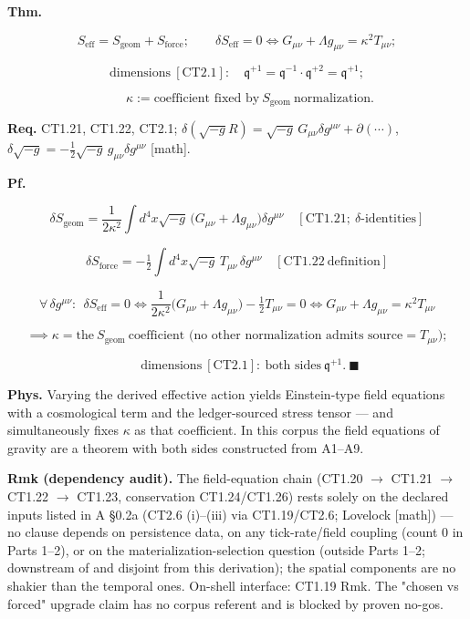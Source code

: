 \begin{theorem}\label{tag:CT1-23}
\textbf{Thm.}

\[
S_{\mathrm{eff}}=S_{\mathrm{geom}}+S_{\mathrm{force}};\qquad
\delta S_{\mathrm{eff}}=0\iff G_{\mu\nu}+\Lambda g_{\mu\nu}=\kappa^2T_{\mu\nu};
\]

\[
\text{dimensions}\ [\mathrm{CT2.1}]:\quad\mathfrak q^{+1}=\mathfrak q^{-1}\cdot\mathfrak q^{+2}=\mathfrak q^{+1};
\]

\[
\qquad \kappa:=\text{coefficient fixed by}\ S_{\mathrm{geom}}\ \text{normalization}.
\]

\textbf{Req.} CT1.21, CT1.22, CT2.1; $\delta(\sqrt{-g}R)=\sqrt{-g}\,G_{\mu\nu}\delta g^{\mu\nu}+\partial(\cdots)$, $\delta\sqrt{-g}=-\tfrac12\sqrt{-g}\,g_{\mu\nu}\delta g^{\mu\nu}$ [math].

\textbf{Pf.}

\[
\delta S_{\mathrm{geom}}=\frac{1}{2\kappa^2}\int d^4x\sqrt{-g}\,\bigl(G_{\mu\nu}+\Lambda g_{\mu\nu}\bigr)\delta g^{\mu\nu}\quad[\mathrm{CT1.21};\ \delta\text{-identities}]
\]

\[
\delta S_{\mathrm{force}}=-\tfrac12\int d^4x\sqrt{-g}\,T_{\mu\nu}\,\delta g^{\mu\nu}\quad[\mathrm{CT1.22}\ \text{definition}]
\]

\[
\forall\,\delta g^{\mu\nu}:\ \ \delta S_{\mathrm{eff}}=0\iff\frac{1}{2\kappa^2}\bigl(G_{\mu\nu}+\Lambda g_{\mu\nu}\bigr)-\tfrac12T_{\mu\nu}=0\iff G_{\mu\nu}+\Lambda g_{\mu\nu}=\kappa^2T_{\mu\nu}
\]

\[
\implies\kappa=\text{the}\ S_{\mathrm{geom}}\ \text{coefficient (no other normalization admits source}=T_{\mu\nu});
\]

\[
\qquad \text{dimensions}\ [\mathrm{CT2.1}]:\ \text{both sides}\ \mathfrak q^{+1}.\ \blacksquare
\]

\textbf{Phys.} Varying the derived effective action yields Einstein-type field equations with a cosmological term and the ledger-sourced stress tensor — and simultaneously fixes $\kappa$ as that coefficient. In this corpus the field equations of gravity are a theorem with both sides constructed from A1–A9.

\textbf{Rmk (dependency audit).} The field-equation chain (CT1.20 $\to$ CT1.21 $\to$ CT1.22 $\to$ CT1.23, conservation CT1.24/CT1.26) rests solely on the declared inputs listed in A §0.2a (CT2.6 (i)–(iii) via CT1.19/CT2.6; Lovelock [math]) — no clause depends on persistence data, on any tick-rate/field coupling (count $0$ in Parts 1–2), or on the materialization-selection question (outside Parts 1–2; downstream of and disjoint from this derivation); the spatial components are no shakier than the temporal ones. On-shell interface: CT1.19 Rmk. The "chosen vs forced" upgrade claim has no corpus referent and is blocked by proven no-gos.

\end{theorem}

